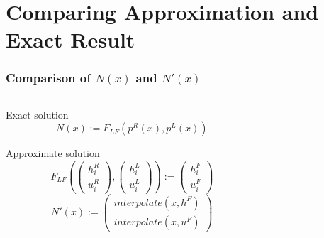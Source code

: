 \documentclass{beamer}
\begin{document}
\section{Comparing Approximation and Exact Result}
\label{sec:comparing-approx-and-exact-result}

\begin{frame}
  \frametitle{Comparison of $N(x)$ and $N'(x)$}
  \begin{columns}
    \begin{column}{.4\textwidth}
      \begin{block}{Exact solution}
        \vspace{-.5cm} %
        \begin{equation*}
          N(x) := F_{LF}(p^R(x),p^L(x))
        \end{equation*}
      \end{block}
      \begin{block}{Approximate solution}
        \vspace{-.5cm} %
        \begin{equation*}
          F_{LF}\left(
            \begin{pmatrix}
              h_i^R \\ u_i^R
            \end{pmatrix},
            \begin{pmatrix}
              h_i^L \\ u_i^L
            \end{pmatrix}
          \right) :=
          \begin{pmatrix}
            h_i^F \\ u_i^F
          \end{pmatrix} %
        \end{equation*}
        \vspace{-.1cm} %
        \begin{equation*}
          N'(x) :=
          \begin{pmatrix}
            interpolate(x,h^F) \\ interpolate(x,u^F)
          \end{pmatrix}
        \end{equation*}        
      \end{block}
    \end{column}
    \begin{column}{.5\textwidth}
      \begin{center}
        \begin{tikzpicture}[scale=0.8]

\end{tikzpicture}
\end{center}
\end{column}
\end{columns}
\end{frame}
\end{document}
